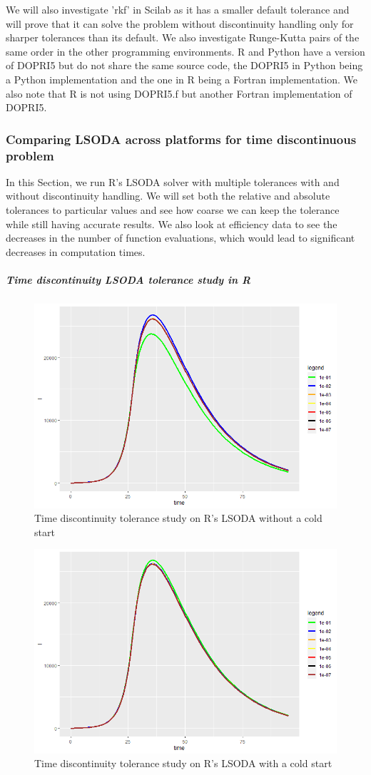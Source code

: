 We will also investigate 'rkf' in Scilab as it has a smaller default tolerance and will prove that it can solve the problem without discontinuity handling only for sharper tolerances than its default. We also investigate Runge-Kutta pairs of the same order in the other programming environments. R and Python have a version of DOPRI5 but do not share the same source code, the DOPRI5 in Python being a Python implementation and the one in R being a Fortran implementation. We also note that R is not using DOPRI5.f but another Fortran implementation of DOPRI5.

\subsubsection{Comparing LSODA across platforms for time discontinuous problem}

In this Section, we run R's LSODA solver with multiple tolerances with and without discontinuity handling. We will set both the relative and absolute tolerances to particular values and see how coarse we can keep the tolerance while still having accurate results. We also look at efficiency data to see the decreases in the number of function evaluations, which would lead to significant decreases in computation times.

\subparagraph{Time discontinuity LSODA tolerance study in R}
\begin{figure}[h]
	\centering
	\includegraphics[width=0.7\linewidth]{./figures/tolerance_time_lsoda_no_event_R}
	\caption{Time discontinuity tolerance study on R's LSODA without a cold start}
	\label{fig:tolerance_time_lsoda_no_event_R}
\end{figure}

\begin{figure}[h]
	\centering
	\includegraphics[width=0.7\linewidth]{./figures/tolerance_time_lsoda_with_event_R}
	\caption{Time discontinuity tolerance study on R's LSODA with a cold start}
	\label{fig:tolerance_time_lsoda_with_event_R}
\end{figure}

